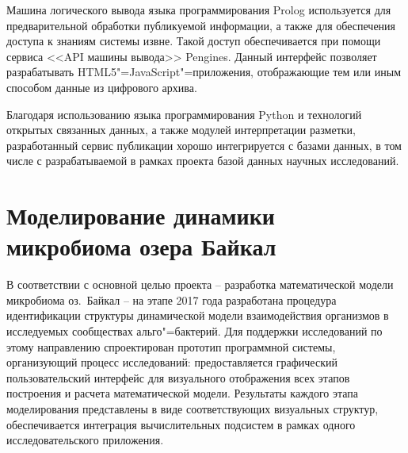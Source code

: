 \documentclass[a4paper,12pt,openany,final]{extreport}
\begin{document}
Машина логического вывода языка программирования Prolog используется для предварительной обработки публикуемой информации, а также для обеспечения доступа к знаниям системы извне. Такой доступ обеспечивается при помощи сервиса <<API машины вывода>> Pengines. Данный интерфейс  позволяет разрабатывать HTML5"=JavaScript"=приложения, отображающие тем или иным способом данные из цифрового архива.

Благодаря использованию языка программирования Python и технологий открытых связанных данных, а также модулей интерпретации разметки, разработанный сервис публикации хорошо интегрируется с базами данных, в том числе с разрабатываемой в рамках проекта базой данных научных исследований.


\chapter{Моделирование динамики микробиома озера Байкал}\label{chap:9}

В соответствии с основной целью проекта -- разработка математической модели микробиома оз.~Байкал -- на этапе 2017 года разработана процедура идентификации структуры динамической модели взаимодействия организмов в исследуемых сообществах альго"=бактерий. Для поддержки исследований по этому направлению спроектирован прототип программной системы, организующий процесс исследований: предоставляется графический пользовательский интерфейс для визуального отображения всех этапов построения и расчета математической модели.  Результаты каждого этапа моделирования представлены в виде соответствующих визуальных структур, обеспечивается интеграция вычислительных подсистем в рамках одного исследовательского приложения.
\end{document}
